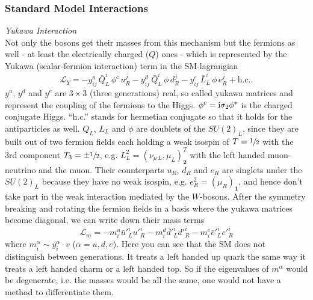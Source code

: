 \subsubsection{Standard Model Interactions}
\textit{Yukawa Interaction} \\
\noindent Not only the bosons get their masses from this mechanism but the fermions as well - at least the electrically charged ($Q$) ones - which is represented by the
Yukawa (scalar-fermion interaction) term in the SM-lagrangian
\begin{equation}
 \mathcal{L}_{Y} = - y^u_{ij}\, \bar Q^i_L \, \phi^c\, u^j_R - y^d_{ij}\, \bar Q^i_L\, \phi\, d^j_R - y^e_{ij}\, \bar L^i_L\, \phi\, e^j_R + \text{h.c.}.
 \label{eq_yukawaSM}
\end{equation}
\noindent
$y^u$, $y^d$ and $y^e$ are $3\times 3$ (three generations) real, so called yukawa matrices and represent the 
coupling of the fermions to the Higgs. $\phi^c = \text{i}\sigma_2\phi^*$ is the charged conjugate Higgs. ``h.c.'' stands for hermetian conjugate so that it holds for the antiparticles as well. 
$Q_L$, $L_L$ and $\phi$ are doublets of the $SU(2)_L$, since they are built out of two fermion fields each holding a 
weak isospin of $T=\sfrac12$ with the 3rd component $T_3 = \pm\sfrac12$, e.g. $L^2_L = (\nu_{\mu\, L}, \mu_L)^T_{\textbf{2}}$ with the left handed muon-neutrino and the muon. 
Their counterparts $u_R$, $d_R$ and $e_R$ are singlets under the $SU(2)_L$ because they have no weak isospin, e.g. $e^2_R = (\mu_R)_{\textbf{1}}$, and hence don't take part
in the weak interaction mediated by the $W$-bosons. After 
the symmetry breaking and rotating the fermion fields in a basis where the yukawa matrices become diagonal, we can write down their mass terms 
\begin{equation}
 \mathcal{L}_m = -m^u_i \bar u'^i_L u'^i_R -m^d_i \bar d'^i_L d'^i_R -m^e_i \bar e'^i_L e'^i_R 
 \label{eq_massSM}
\end{equation}
\noindent
where $m^\alpha_i \sim y^\alpha_i \cdot v$ ($\alpha = u,d,e$). Here you can see that the SM does not distinguish between generations. 
It treats a left handed up quark the same way it treats a left handed charm or a left handed top. So if the eigenvalues of $m^\alpha$ would be degenerate, i.e. the masses would
be all the same, one would not have a method to differentiate them. 

